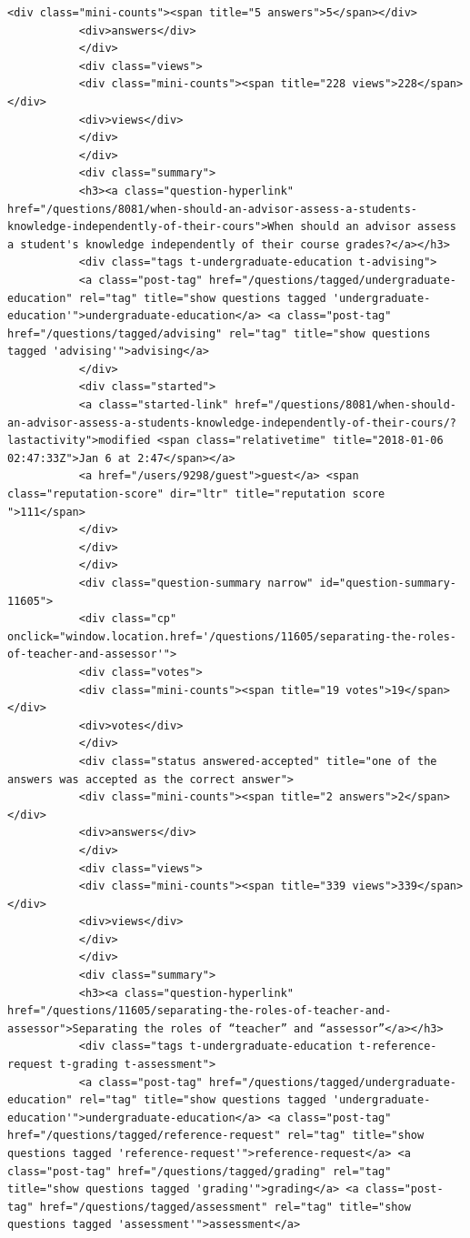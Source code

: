 \documentclass[11pt]{article}
\begin{document}
\begin{Verbatim}[commandchars=\\\{\}]
           <div class="mini-counts"><span title="5 answers">5</span></div>
           <div>answers</div>
           </div>
           <div class="views">
           <div class="mini-counts"><span title="228 views">228</span></div>
           <div>views</div>
           </div>
           </div>
           <div class="summary">
           <h3><a class="question-hyperlink" href="/questions/8081/when-should-an-advisor-assess-a-students-knowledge-independently-of-their-cours">When should an advisor assess a student's knowledge independently of their course grades?</a></h3>
           <div class="tags t-undergraduate-education t-advising">
           <a class="post-tag" href="/questions/tagged/undergraduate-education" rel="tag" title="show questions tagged 'undergraduate-education'">undergraduate-education</a> <a class="post-tag" href="/questions/tagged/advising" rel="tag" title="show questions tagged 'advising'">advising</a>
           </div>
           <div class="started">
           <a class="started-link" href="/questions/8081/when-should-an-advisor-assess-a-students-knowledge-independently-of-their-cours/?lastactivity">modified <span class="relativetime" title="2018-01-06 02:47:33Z">Jan 6 at 2:47</span></a>
           <a href="/users/9298/guest">guest</a> <span class="reputation-score" dir="ltr" title="reputation score ">111</span>
           </div>
           </div>
           </div>
           <div class="question-summary narrow" id="question-summary-11605">
           <div class="cp" onclick="window.location.href='/questions/11605/separating-the-roles-of-teacher-and-assessor'">
           <div class="votes">
           <div class="mini-counts"><span title="19 votes">19</span></div>
           <div>votes</div>
           </div>
           <div class="status answered-accepted" title="one of the answers was accepted as the correct answer">
           <div class="mini-counts"><span title="2 answers">2</span></div>
           <div>answers</div>
           </div>
           <div class="views">
           <div class="mini-counts"><span title="339 views">339</span></div>
           <div>views</div>
           </div>
           </div>
           <div class="summary">
           <h3><a class="question-hyperlink" href="/questions/11605/separating-the-roles-of-teacher-and-assessor">Separating the roles of “teacher” and “assessor”</a></h3>
           <div class="tags t-undergraduate-education t-reference-request t-grading t-assessment">
           <a class="post-tag" href="/questions/tagged/undergraduate-education" rel="tag" title="show questions tagged 'undergraduate-education'">undergraduate-education</a> <a class="post-tag" href="/questions/tagged/reference-request" rel="tag" title="show questions tagged 'reference-request'">reference-request</a> <a class="post-tag" href="/questions/tagged/grading" rel="tag" title="show questions tagged 'grading'">grading</a> <a class="post-tag" href="/questions/tagged/assessment" rel="tag" title="show questions tagged 'assessment'">assessment</a>

\end{Verbatim}
\end{document}
